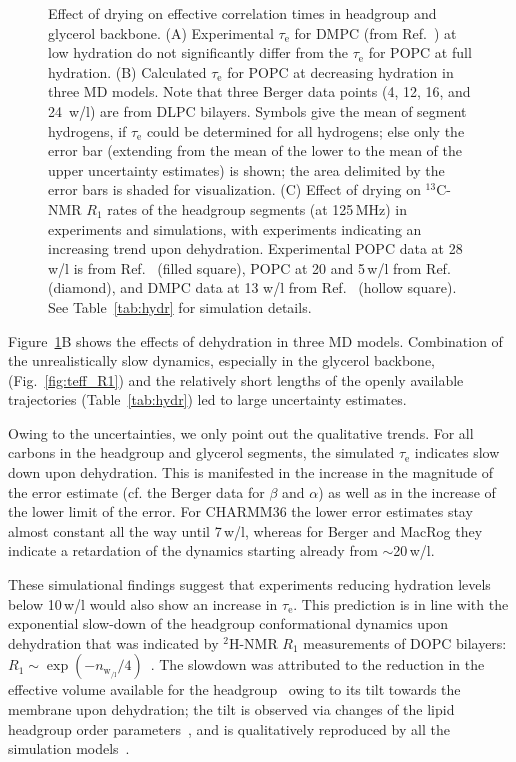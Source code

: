 \documentclass[journal=jcisd8,manuscript=article,layout=twocolumn]{achemso}
\begin{document}
\begin{figure}[ht!]
\caption{Effect of drying on %
effective correlation times %
in headgroup and glyc\-er\-ol backbone.
(A) Experimental $\tau_\mathrm e$ for
DMPC (from Ref.~) at low hydration %
do not significantly differ from the
$\tau_\mathrm e$ for POPC at full hydration. %
(B) Calculated $\tau_\mathrm e$  for
POPC at decreasing hydration in three MD models.
Note that three Berger data points (4, 12, 16, and 24~w/l) are from DLPC bilayers.
Symbols give the mean of segment hydrogens,
if $\tau_\mathrm{e}$ could be determined for all hydrogens; else only the error bar
(extending from the mean of the lower to the mean of the upper uncertainty estimates) is shown;
the area delimited by the error bars is shaded for visualization. (C) Effect of drying on $^{13}$C-NMR $R_1$ rates of the headgroup segments (at 125\,MHz)
in experiments and simulations, with experiments indicating an increasing trend upon dehydration. Experimental POPC data at 28 w/l is from Ref.~ (filled square), POPC at 20 and 5\,w/l from Ref.~ (diamond), and DMPC data at 13 w/l from Ref.~ (hollow square). 
See Table~\ref{tab:hydr} for simulation details.}
\label{fig:hydration}
\end{figure}

Figure~\ref{fig:hydration}B shows the effects of dehydration in three MD models.
Combination of
the unrealistically slow dynamics, especially in the glycerol backbone, (Fig.~\ref{fig:teff_R1}) and
the relatively short lengths of the openly available trajectories %
(Table~\ref{tab:hydr})
led to large uncertainty estimates. %
%

Owing to the uncertainties, we only point out the qualitative trends. For all carbons in the headgroup and glycerol segments, the simulated  $\tau_\mathrm e$ indicates slow down upon dehydration. This is manifested in the increase in the magnitude of the error estimate (cf. the Berger data for $\beta$ and $\alpha$) as well as in the increase of the lower limit of the error. 
For CHARMM36 the lower error estimates stay almost constant all the way until 7\,w/l, whereas for Berger and MacRog they indicate a retardation of the dynamics starting already from $\sim$20\,w/l.

These simulational findings suggest that
experiments reducing hydration levels below 10\,w/l would also show an increase in $\tau_\mathrm e$.
This prediction is in line with the
exponential slow-down
of the headgroup conformational dynamics
upon dehydration that was indicated by $^2$H-NMR $R_{1}$ measurements
of DOPC bilayers:
$R_1\sim\exp(-n_{{\mathrm w\!}_{/\mathrm l}}/4)$~\cite{ulrich94}.
%
The slowdown was attributed to the reduction in the effective volume available for the headgroup~\cite{ulrich94}
owing to its tilt towards the membrane upon dehydration;
the tilt is observed via changes of the lipid headgroup order parameters~\cite{bechinger91},
and is qualitatively reproduced by all the simulation models~\cite{botan15}.
\end{document}
